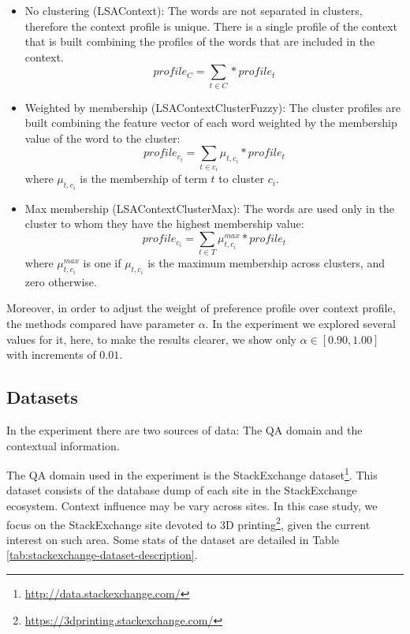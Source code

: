 \documentclass[preprint]{elsarticle}
\begin{document}
\begin{spacing}{1.5}
\begin{itemize}

	\item No clustering (LSAContext): The words are not separated in clusters, therefore the context profile is unique. There is a single profile of the context that is built combining the profiles of the words that are included in the context.
	\begin{equation}
		profile_{C} = \sum_{t \in C} * profile_t
	\end{equation}

	\item Weighted by membership (LSAContextClusterFuzzy): The cluster profiles are built combining the feature vector of each word weighted by the membership value of the word to the cluster:
	\begin{equation}
		profile_{c_i} = \sum_{t \in c_i} \mu_{t,c_i} * profile_t
	\end{equation}
	\noindent where $\mu_{t,c_i}$ is the membership of term $t$ to cluster $c_i$.

	\item Max membership (LSAContextClusterMax): The words are used only in the cluster to whom they have the highest membership value:
	\begin{equation}
		profile_{c_i} = \sum_{t \in T} \mu^{max}_{t,c_i} * profile_t
	\end{equation}
	\noindent where $\mu^{max}_{t,c_i}$ is one if $\mu_{t,c_i}$ is the maximum membership across clusters, and zero otherwise.

\end{itemize}

Moreover, in order to adjust the weight of preference profile over context profile, the methods compared have parameter $\alpha$. In the experiment we explored several values for it, here, to make the results clearer, we show only $\alpha \in [0.90,1.00]$ with increments of $0.01$.

\subsection{Datasets}
\label{sec:case-study-datasets}

In the experiment there are two sources of data: The QA domain and the contextual information.

The QA domain used in the experiment is the StackExchange dataset\footnote{\url{http://data.stackexchange.com/}}. This dataset consists of the database dump of each site in the StackExchange ecosystem. Context influence may be vary across sites. In this case study, we focus on the StackExchange site devoted to 3D printing\footnote{\url{https://3dprinting.stackexchange.com/}}, given the current interest on such area. Some stats of the dataset are detailed in Table \ref{tab:stackexchange-dataset-description}.


\end{spacing}
\end{document}
